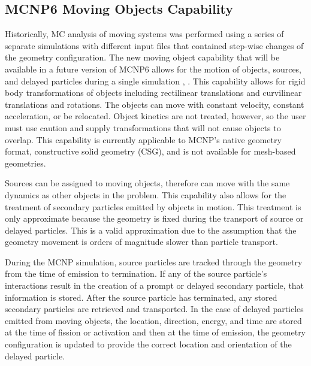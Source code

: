 \subsection{MCNP6 Moving Objects Capability} \label{sec:mcnp_move}
Historically, MC analysis of moving systems was performed using a 
series of separate simulations with different input files that contained 
step-wise changes of the geometry configuration. 
The new moving object capability that will be available in a future version
of MCNP6 allows for the
motion of objects, sources, and delayed particles during a single simulation
\cite{mcnp_moving_1}, \cite{mcnp_moving_2}.
This capability allows for rigid body transformations of 
objects including rectilinear translations and curvilinear translations and rotations.
The objects can move with constant velocity, constant acceleration, or be
relocated.
Object kinetics are not treated, however, so the user must use caution and supply
transformations that will not cause objects to overlap.
This capability is currently applicable to MCNP's native geometry format,
constructive solid geometry (CSG), and is not available for mesh-based
geometries.

Sources can be assigned to moving objects, therefore can move with the
same dynamics as other objects in the problem.
This capability also allows for the treatment of secondary particles emitted by
objects in motion. This treatment is only approximate because the geometry is fixed during the
transport of source or delayed particles. This is a valid approximation due to
the assumption that the geometry movement is orders of magnitude slower than
particle transport.

During the MCNP simulation, source particles are tracked through the geometry
from the time of emission to termination.  If any of the source particle's
interactions result in the creation of a prompt or delayed secondary particle,
that information is stored.  After the source particle has terminated, any
stored secondary particles are retrieved and transported.
In the case of delayed particles emitted from moving objects, the location, direction, energy, and
time are stored at the time of fission or activation and then at the time of
emission, the geometry configuration is updated to provide the correct 
location and orientation of the delayed particle. 



